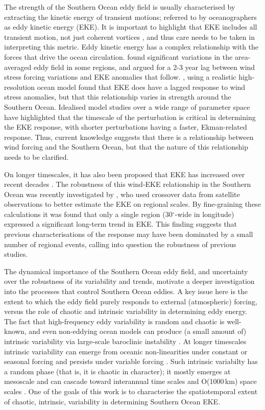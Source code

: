 \documentclass[linenumbers]{agujournal2019}
\begin{document}
The strength of the Southern Ocean eddy field is usually characterised by extracting the kinetic energy of transient motions; referred to by oceanographers as eddy kinetic energy (EKE). 
It is important to highlight that EKE includes all transient motion, not just coherent vortices \citep{Martinez-Moreno2019}, and thus care needs to be taken in interpreting this metric.
Eddy kinetic energy has a complex relationship with the forces that drive the ocean circulation.
\citet{Meredith-Hogg-2006} found significant variations in the area-averaged eddy field in some regions, and argued for a 2-3 year lag between wind stress forcing variations and EKE anomalies that follow.
\citet{Patara2016}, using a realistic high-resolution ocean model found that EKE does have a lagged response to wind stress anomalies, but that this relationship varies in strength around the Southern Ocean.
Idealised model studies over a wide range of parameter space \citep{Sinha2016} have highlighted that the timescale of the perturbation is critical in determining the EKE response, with shorter perturbations having a faster, Ekman-related response.
Thus, current knowledge suggests that there is a relationship between wind forcing and the Southern Ocean, but that the nature of this relationship needs to be clarified.

On longer timescales, it has also been proposed that EKE has increased over recent decades \citep{Hogg2015, Martinez-Moreno2019, Martinez-Moreno2021-ncc}.
The robustness of this wind-EKE relationship in the Southern Ocean was recently investigated by \citet{Zhang2021}, who used crossover data from satellite observations \citep[as in][]{Hogg2015} to better estimate the EKE on regional scales.
By fine-graining these calculations it was found that only a single region (30$^\circ$-wide in longitude) expressed a significant long-term trend in EKE.
This finding  suggests that previous characterisations of the response may have been dominated by a small number of regional events, calling into question the robustness of previous studies.

The dynamical importance of the Southern Ocean eddy field, and uncertainty over the robustness of its variability and trends, motivate a deeper investigation into the processes that control Southern Ocean eddies.
A key issue here is the extent to which the eddy field purely responds to external (atmospheric) forcing, versus the role of chaotic and intrinsic variability in determining eddy energy.
The fact that high-frequency eddy variability is random and chaotic is well-known, and even non-eddying ocean models can produce (a small amount of) intrinsic variability via large-scale baroclinic instability \citep[e.g.][]{DeVerdiere1999,Constantinou2021}.
At longer timescales intrinsic variability can emerge from oceanic non-linearities under constant or seasonal forcing and persists under variable forcing \citep{Leroux2018}.
Such intrinsic variabilty has a random phase (that is, it is chaotic in character); it mostly emerges at mesoscale and can cascade toward interannual time scales and O(1000$\,$km) space scales \citep{Serazin-etal-2018}.
One of the goals of this work is to characterise the spatiotemporal extent of chaotic, intrinsic, variability in determining  Southern Ocean EKE.
\end{document}
